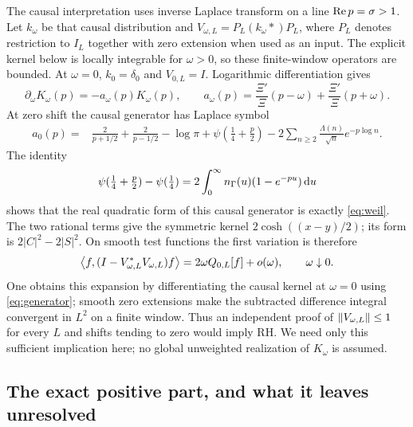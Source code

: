 The causal interpretation uses inverse Laplace transform on a line
$\operatorname{Re} p=\sigma>1$. Let $k_\omega$ be that causal distribution and
$V_{\omega,L}=P_L(k_\omega*)P_L$, where $P_L$ denotes restriction to
$I_L$ together with zero extension when used as an input. The explicit
kernel below is locally integrable for $\omega>0$, so these finite-window
operators are bounded. At $\omega=0$, $k_0=\delta_0$ and $V_{0,L}=I$.
Logarithmic differentiation gives
\begin{equation}
 \partial_\omega K_\omega(p)=-a_\omega(p)K_\omega(p),\qquad
 a_\omega(p)=\frac{\Xi'}{\Xi}(p-\omega)
             +\frac{\Xi'}{\Xi}(p+\omega).
\end{equation}
At zero shift the causal generator has Laplace symbol
\begin{align}\label{eq:generator}
 a_0(p)={}&\frac2{p+1/2}+\frac2{p-1/2}-\log\pi
 +\psi(\tfrac14+\tfrac p2)
 -2\sum_{n\geq2}\frac{\Lambda(n)}{\sqrt n}e^{-p\log n}.
\end{align}
The identity
\begin{equation}
 \psi(\tfrac14+\tfrac p2)-\psi(\tfrac14)
 =2\int_0^\infty n_\Gamma(u)(1-e^{-pu})\,\mathrm d u
\end{equation}
shows that the real quadratic form of this causal generator is exactly
\eqref{eq:weil}. The two rational terms give the symmetric kernel
$2\cosh((x-y)/2)$; its form is $2|C|^2-2|S|^2$.
On smooth test functions the first variation is therefore
\begin{equation}\label{eq:first-variation-arithmetic}
 \left\langle f,(I-V_{\omega,L}^*V_{\omega,L})f\right\rangle
 =2\omega Q_{0,L}[f]+o(\omega),\qquad\omega\downarrow0.
\end{equation}
One obtains this expansion by differentiating the causal kernel at
$\omega=0$ using \eqref{eq:generator}; smooth zero extensions make the
subtracted difference integral convergent in $L^2$ on a finite window.
Thus an independent proof of $\left\lVert V_{\omega,L}\right\rVert\leq1$ for every $L$
and shifts tending to zero would imply RH. We need only this sufficient
implication here; no global unweighted realization of $K_\omega$ is
assumed.

\subsection{The exact positive part, and what it leaves unresolved}

